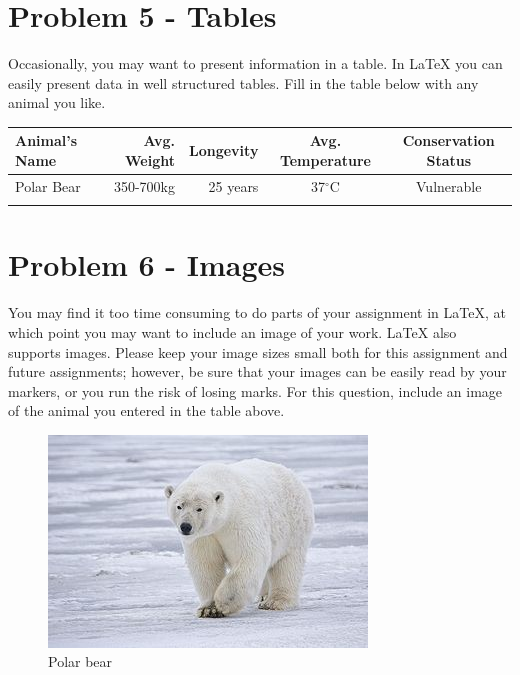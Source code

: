 \documentclass[12pt]{article}
\begin{document}
\section*{Problem 5 - Tables}
Occasionally, you may want to present information in a table. In \LaTeX{} you can easily
 present data in well structured tables. 
Fill in the table below with any animal you like.\\

 

\begin{tabular}{ | l || r  | r | c | c |} \hline
  Animal's Name & Avg. Weight & Longevity & Avg. Temperature & Conservation Status  \\ \hline
   Polar Bear & 350-700kg & 25 years & 37$^{\circ}$C  & Vulnerable \\ \hline
    & & & & \\ \hline
\end{tabular}

\section*{Problem 6 - Images}
You may find it too time consuming to do parts of your assignment in \LaTeX{}, at which 
point you may want to include an image of your work. \LaTeX{} also supports images. 
Please keep your image sizes small both for this assignment and future assignments; 
however, be sure that your images can be easily read by your markers, or you run the 
risk of losing marks. For this question, include an image of the animal you entered
in the table above.\\


\begin{figure}
\begin{center}
        \includegraphics[scale=0.5]{polar_bear.jpg}
\end{center}
\caption{\label{figcaption} Polar bear}
\end{figure}
\end{document}
